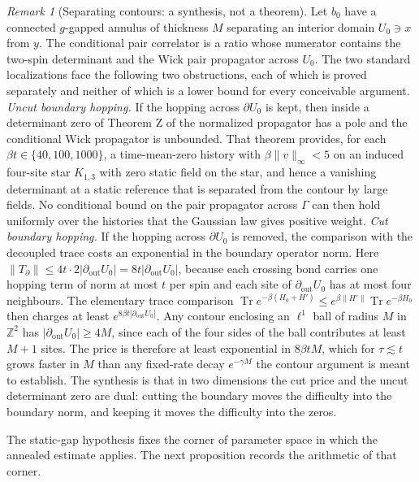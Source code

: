 \documentclass[11pt]{article}
\theoremstyle{definition}
\theoremstyle{remark}
\newtheorem{remark}[theorem]{Remark}
\DeclareMathOperator{\Tr}{Tr}
\begin{document}
\begin{remark}[Separating contours: a synthesis, not a theorem]
\label{rem:contour}
Let $b_0$ have a connected $g$-gapped annulus of thickness $M$ separating an interior
domain $U_0\ni x$ from $y$. The conditional pair correlator is a ratio whose numerator
contains the two-spin determinant and the Wick pair propagator across $U_0$. The two
standard localizations face the following two obstructions, each of which is proved
separately and neither of which is a lower bound for every conceivable argument.
\emph{Uncut boundary hopping.} If the hopping across $\partial U_0$ is kept, then
inside a determinant zero of Theorem Z of \cite{barriers} the normalized propagator
has a pole and the conditional Wick propagator is unbounded. That theorem provides,
for each $\beta t\in\{40,100,1000\}$, a time-mean-zero history with
$\beta\|v\|_\infty<5$ on an induced four-site star $K_{1,3}$ with zero static field on
the star, and hence a vanishing determinant at a static reference that is separated from
the contour by large fields. No conditional bound on the pair propagator across
$\Gamma$ can then hold uniformly over the histories that the Gaussian law gives
positive weight.
\emph{Cut boundary hopping.} If the hopping across $\partial U_0$ is removed, the
comparison with the decoupled trace costs an exponential in the boundary operator
norm. Here $\|T_\partial\|\le4t\cdot 2|\partial_{\mathrm{out}}U_0|=8t|\partial_{\mathrm{out}}U_0|$,
because each crossing bond carries one hopping term of norm at most $t$ per spin and
each site of $\partial_{\mathrm{out}}U_0$ has at most four neighbours. The elementary
trace comparison $\Tr e^{-\beta(H_0+H')}\le e^{\beta\|H'\|}\Tr e^{-\beta H_0}$ then
charges at least $e^{8\beta t|\partial_{\mathrm{out}}U_0|}$. Any
contour enclosing an $\ell^1$ ball of radius $M$ in $\mathbb{Z}^2$ has
$|\partial_{\mathrm{out}}U_0|\ge4M$, since each of the four sides of the ball
contributes at least $M+1$ sites. The price is therefore at least exponential in
$8\beta tM$, which for $\tau\lesssim t$ grows faster in $M$ than any fixed-rate decay
$e^{-\gamma M}$ the contour argument is meant to establish. The synthesis is that in
two dimensions the cut price and the uncut determinant zero are dual: cutting the
boundary moves the difficulty into the boundary norm, and keeping it moves the
difficulty into the zeros.
\end{remark}

The static-gap hypothesis fixes the corner of parameter space in which the annealed
estimate applies. The next proposition records the arithmetic of that corner.
\end{document}
